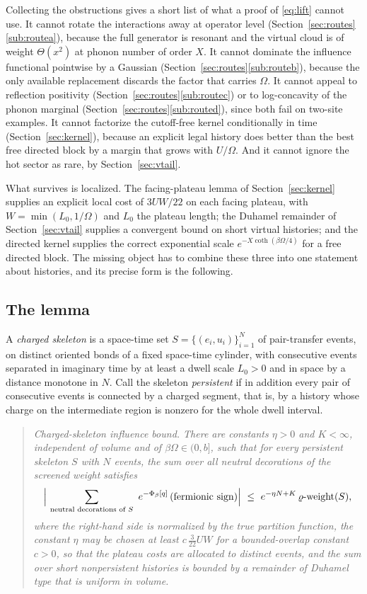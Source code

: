 \documentclass[11pt]{article}
\theoremstyle{definition}
\theoremstyle{remark}
\begin{document}
Collecting the obstructions gives a short list of what a proof of \eqref{eq:lift}
cannot use. It cannot rotate the interactions away at operator level
(Section~\ref{sec:routes}\ref{sub:routea}), because the full generator is
resonant and the virtual cloud is of weight $\Theta(x^{2})$ at phonon number of
order $X$. It cannot dominate the influence functional pointwise by a Gaussian
(Section~\ref{sec:routes}\ref{sub:routeb}), because the only available
replacement discards the factor that carries $\Omega$. It cannot appeal to
reflection positivity (Section~\ref{sec:routes}\ref{sub:routec}) or to
log-concavity of the phonon marginal (Section~\ref{sec:routes}\ref{sub:routed}),
since both fail on two-site examples. It cannot factorize the cutoff-free kernel
conditionally in time (Section~\ref{sec:kernel}), because an explicit legal
history does better than the best free directed block by a margin that grows with
$U/\Omega$. And it cannot ignore the hot sector as rare, by
Section~\ref{sec:vtail}.

What survives is localized. The facing-plateau lemma of
Section~\ref{sec:kernel} supplies an explicit local cost of $3UW/22$ on each
facing plateau, with $W=\min(L_{0},1/\Omega)$ and $L_{0}$ the plateau length;
the Duhamel remainder of
Section~\ref{sec:vtail} supplies a convergent bound on short virtual histories;
and the directed kernel supplies the correct exponential scale
$e^{-X\coth(\beta\Omega/4)}$ for a free directed block. The missing object has to
combine these three into one statement about histories, and its precise form is
the following.

\subsection{The lemma}

A \emph{charged skeleton} is a space-time set
$S=\{(e_{i},u_{i})\}_{i=1}^{N}$ of pair-transfer events, on distinct oriented
bonds of a fixed space-time cylinder, with consecutive events separated in
imaginary time by at least a dwell scale $L_{0}>0$ and in space by a distance
monotone in $N$. Call the skeleton
\emph{persistent} if in addition every pair of consecutive events is connected by
a charged segment, that is, by a history whose charge on the intermediate region
is nonzero for the whole dwell interval.

\begin{quote}\itshape
Charged-skeleton influence bound. There are constants $\eta>0$ and $K<\infty$,
independent of volume and of $\beta\Omega\in(0,b]$, such that for every persistent
skeleton $S$ with $N$ events, the sum over all neutral decorations of the
screened weight satisfies
\[
\Bigl|\ \sum_{\text{neutral decorations of }S}\ e^{-\Phi_{\beta}[q]}\,
(\text{fermionic sign})\Bigr|
\ \le\ e^{-\eta N+K}\,\varrho\text{-weight}(S),
\]
where the right-hand side is normalized by the true partition function, the
constant $\eta$ may be chosen at least $c\,\frac{3}{22}UW$ for a bounded-overlap
constant $c>0$, so that the plateau costs are allocated to distinct events, and the sum
over short nonpersistent histories is bounded by a remainder of Duhamel type that
is uniform in volume.
\end{quote}
\end{document}
